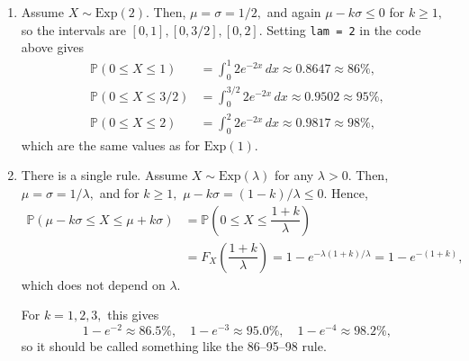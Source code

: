 \documentclass[12pt]{article}
\begin{document}
\begin{enumerate}
\begin{enumerate}
      \item Assume $X \sim \text{Exp}(2).$ Then, $\mu = \sigma =
        1/2,$ and again $\mu - k\sigma \leq 0$ for $k \geq 1,$ so the
        intervals are $[0, 1], [0, 3/2], [0, 2].$ Setting \texttt{lam
        = 2} in the code above gives
        \begin{align*}
          \mathbb P(0 \leq X \leq 1) &= \int_0^1 2e^{-2x} \, dx
          \approx 0.8647 \approx 86\%, \\
          \mathbb P(0 \leq X \leq 3/2) &= \int_0^{3/2} 2e^{-2x} \, dx
          \approx 0.9502 \approx 95\%, \\
          \mathbb P(0 \leq X \leq 2) &= \int_0^2 2e^{-2x} \, dx
          \approx 0.9817 \approx 98\%,
        \end{align*}
        which are the same values as for $\text{Exp}(1).$

      \item There is a single rule. Assume $X \sim
        \text{Exp}(\lambda)$ for any $\lambda > 0.$ Then, $\mu =
        \sigma = 1/\lambda,$ and for $k \geq 1,$ $\mu - k\sigma = (1
        - k)/\lambda \leq 0.$ Hence,
        \begin{align*}
          \mathbb P(\mu - k\sigma \leq X \leq \mu + k\sigma) &=
          \mathbb P\left(0 \leq X \leq \dfrac{1 + k}{\lambda}\right) \\
          &= F_X\left(\dfrac{1 + k}{\lambda}\right) = 1 - e^{-\lambda
          (1 + k)/\lambda} = 1 - e^{-(1 + k)},
        \end{align*}
        which does not depend on $\lambda.$

        For $k = 1, 2, 3,$ this gives
        $$
        1 - e^{-2} \approx 86.5\%, \quad 1 - e^{-3} \approx 95.0\%,
        \quad 1 - e^{-4} \approx 98.2\%,
        $$
        so it should be called something like the 86--95--98 rule.
    \end{enumerate}
\end{enumerate}
\end{document}
